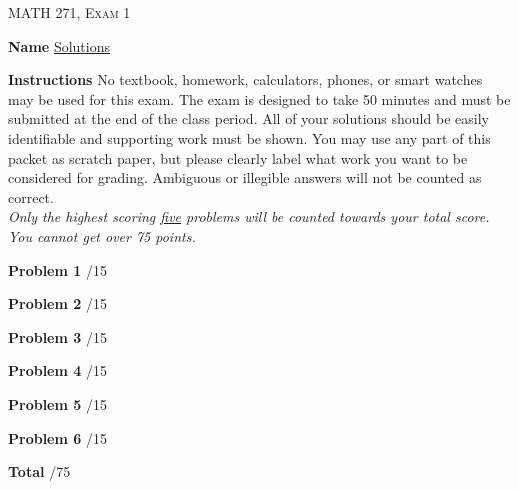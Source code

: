 \documentclass[12pt]{amsbook}
\begin{document}

\begin{center}
   \textsc{\large MATH 271, Exam 1}\\
\end{center}
\vspace{1cm}

\noindent\textbf{Name} \; \underline{Solutions\hspace{6.5cm}}

\vspace{1cm}

\noindent\textbf{Instructions} \; No textbook, homework, calculators, phones, or smart watches may be used for this exam. The exam is designed to take 50 minutes and must be submitted at the end of the class period. All of your solutions should be easily identifiable and supporting work must be shown. You may use any part of this packet as scratch paper, but please clearly label what work you want to be considered for grading. Ambiguous or illegible answers will not be counted as correct.\\

\noindent\emph{Only the highest scoring \underline{five} problems will be counted towards your total score. You cannot get over 75 points.}

\vspace{1cm}

\begin{flushleft}
\textbf{Problem 1} \; \underline{\hspace{1cm}}/15

\vspace{.25cm}

\textbf{Problem 2} \; \underline{\hspace{1cm}}/15

\vspace{.25cm}

\textbf{Problem 3} \; \underline{\hspace{1cm}}/15

\vspace{.25cm}

\textbf{Problem 4} \; \underline{\hspace{1cm}}/15

\vspace{.25cm}

\textbf{Problem 5} \; \underline{\hspace{1cm}}/15

\vspace{.25cm}

\textbf{Problem 6} \; \underline{\hspace{1cm}}/15

\vspace{.5cm}

\textbf{Total} \;\hspace{1.1cm} \underline{\hspace{1.25cm}}/75
\end{flushleft}
\end{document}
